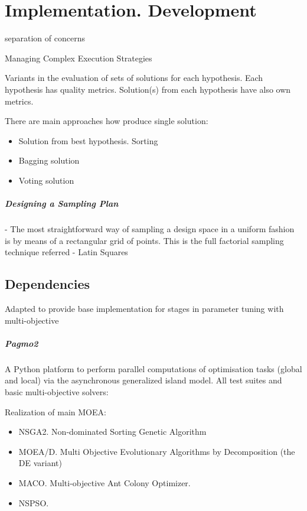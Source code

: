 \chapter{Implementation. Development}

separation of concerns

Managing Complex Execution Strategies

Variants in the evaluation of sets of solutions for each hypothesis. Each hypothesis has quality metrics. Solution(s) from each hypothesis have also own metrics.
               
There are main approaches how produce single solution: 
\begin{itemize}
    \item Solution from best hypothesis. Sorting
    \item Bagging solution
    \item Voting solution                
\end{itemize}

\paragraph{Designing a Sampling Plan}
 - The most straightforward way of sampling a design space in a uniform fashion is by \cite{EngSurMod}
 means of a rectangular grid of points. This is the full factorial sampling technique referred
 - Latin Squares

\section{Dependencies}
    Adapted to provide base implementation for stages in parameter tuning with multi-objective

    \paragraph{Pagmo2} 
        A Python platform \cite{francesco_biscani_2019} to perform parallel computations of optimisation tasks (global and local) via the asynchronous generalized island model.
        All test suites and basic multi-objective solvers:

        Realization of main MOEA:
        \begin{itemize}
            \item NSGA2. Non-dominated Sorting Genetic Algorithm
            \item MOEA/D. Multi Objective Evolutionary Algorithms by Decomposition (the DE variant)
            \item MACO. Multi-objective Ant Colony Optimizer.
            \item NSPSO. 
        \end{itemize}


